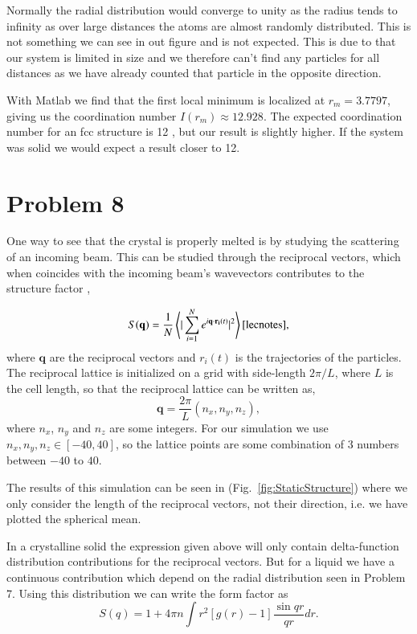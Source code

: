 Normally the radial distribution would converge to unity as the radius tends to infinity as over large distances the atoms are almost randomly distributed. This is not something we can see in out figure and is not expected. This is due to that our system is limited in size and we therefore can't find any particles for all distances as we have already counted that particle in the opposite direction.

With Matlab we find that the first local minimum is localized at $r_m = 3.7797$, giving us the coordination number $I(r_m) \approx 12.928$. The expected coordination number for an fcc structure is 12 \cite{al_coordination_nbr}, but our result is slightly higher. If the system was solid we would expect a result closer to 12.

\section*{Problem 8}

One way to see that the crystal is properly melted is by studying the scattering of an incoming beam. This can be studied through the reciprocal vectors, which when coincides with the incoming beam's wavevectors contributes to the structure factor \cite{kittel},

\begin{equation}
S(\mathbf{q})=\frac{1}{N}\left<|\sum_{i=1}^{N}e^{i\mathbf{q}\cdot \mathbf{r_i}(t)}|^2\right>\cite{lecnotes},
\end{equation}
where $\mathbf{q}$ are the reciprocal vectors and $r_i(t)$ is the trajectories of the particles. The reciprocal lattice is initialized on a grid with side-length $2\pi/L$, where $L$ is the cell length, so that the reciprocal lattice can be written as,
\begin{equation}
	\mathbf{q}=\frac{2\pi}{L}(n_x,n_y,n_z),
\end{equation}
where $n_x$, $n_y$ and $n_z$ are some integers. For our simulation we use $n_x, n_y, n_z \in [-40, 40]$, so the lattice points are some combination of $3$ numbers between $-40$ to $40$.

The results of this simulation can be seen in (Fig.~\ref{fig:StaticStructure}) where we only consider the length of the reciprocal vectors, not their direction, i.e. we have plotted the spherical mean.

In a crystalline solid the expression given above will only contain delta-function distribution contributions for the reciprocal vectors. But for a liquid we have a continuous contribution which depend on the radial distribution seen in Problem 7. Using this distribution we can write the form factor as
\begin{equation}
S(q)= 1+ 4\pi n \int r^2\left[g(r)-1\right]\frac{\sin{qr}}{qr}dr.
\end{equation}

